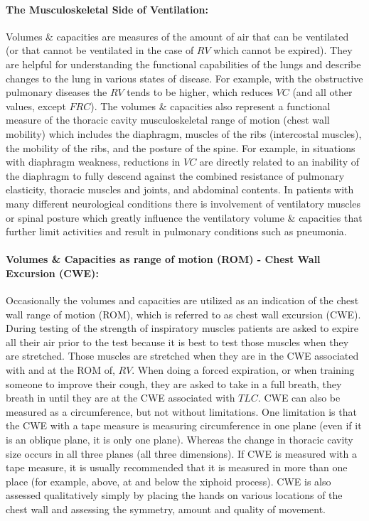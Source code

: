 \paragraph{The Musculoskeletal Side of Ventilation:} Volumes \& capacities are measures of the amount of air that can be ventilated (or that cannot be ventilated in the case of $RV$ which cannot be expired). They are helpful for understanding the functional capabilities of the lungs and describe changes to the lung in various states of disease. For example, with the obstructive pulmonary diseases the $RV$ tends to be higher, which reduces $VC$ (and all other values, except $FRC$). The volumes \& capacities also represent a functional measure of the thoracic cavity musculoskeletal range of motion (chest wall mobility) which includes the diaphragm, muscles of the ribs (intercostal muscles), the mobility of the ribs, and the posture of the spine. For example, in situations with diaphragm weakness, reductions in $VC$ are directly related to an inability of the diaphragm to fully descend against the combined resistance of pulmonary elasticity, thoracic muscles and joints, and abdominal contents. In patients with many different neurological conditions there is involvement of ventilatory muscles or spinal posture which greatly influence the ventilatory volume \& capacities that further limit activities and result in pulmonary conditions such as pneumonia.

\paragraph{Volumes \& Capacities as range of motion (ROM) - Chest Wall Excursion (CWE):} Occasionally the volumes and capacities are utilized as an indication of the chest wall range of motion (ROM), which is referred to as chest wall excursion (CWE). During testing of the strength of inspiratory muscles patients are asked to expire all their air prior to the test because it is best to test those muscles when they are stretched. Those muscles are stretched when they are in the CWE associated with and at the ROM of, $RV$. When doing a forced expiration, or when training someone to improve their cough, they are asked to take in a full breath, they breath in until they are at the CWE associated with $TLC$. CWE can also be measured as a circumference, but not without limitations. One limitation is that the CWE with a tape measure is measuring circumference in one plane (even if it is an oblique plane, it is only one plane). Whereas the change in thoracic cavity size occurs in all three planes (all three dimensions). If CWE is measured with a tape measure, it is usually recommended that it is measured in more than one place (for example, above, at and below the xiphoid process). CWE is also assessed qualitatively simply by placing the hands on various locations of the chest wall and assessing the symmetry, amount and quality of movement.

